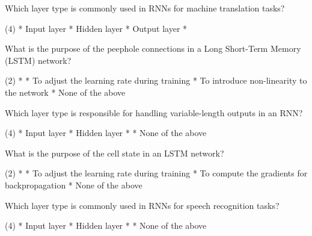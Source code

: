 \documentclass[10pt]{extarticle}
\begin{document}
\begin{exercise}
    Which layer type is commonly used in RNNs for machine translation tasks?
    \begin{choice} (4)
        * Input layer
        * Hidden layer
        * Output layer
        * 
    \end{choice}
\end{exercise}
\begin{solution}
\end{solution}

\begin{exercise}
    What is the purpose of the peephole connections in a Long Short-Term Memory (LSTM) network?
    \begin{choice} (2)
        * 
        * To adjust the learning rate during training
        * To introduce non-linearity to the network
        * None of the above
    \end{choice}
\end{exercise}
\begin{solution}
\end{solution}

\begin{exercise}
    Which layer type is responsible for handling variable-length outputs in an RNN?
    \begin{choice} (4)
        * Input layer
        * Hidden layer
        * 
        * None of the above
    \end{choice}
\end{exercise}
\begin{solution}
\end{solution}

\begin{exercise}
    What is the purpose of the cell state in an LSTM network?
    \begin{choice} (2)
        * 
        * To adjust the learning rate during training
        * To compute the gradients for backpropagation
        * None of the above
    \end{choice}
\end{exercise}
\begin{solution}
\end{solution}

\begin{exercise}
    Which layer type is commonly used in RNNs for speech recognition tasks?
    \begin{choice} (4)
        * Input layer
        * Hidden layer
        * 
        * None of the above
    \end{choice}
\end{exercise}
\begin{solution}
\end{solution}
\end{document}
